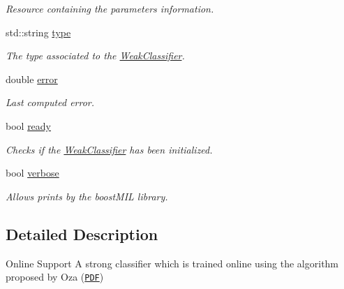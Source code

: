 \begin{DoxyCompactItemize}
\begin{DoxyCompactList}\small\item\em Resource containing the parameters information. \end{DoxyCompactList}\item 
std\+::string \hyperlink{classiCub_1_1boostMIL_1_1WeakClassifier_a6e08c26ea2e12086317d6cdd0f65bbd9}{type}\label{classiCub_1_1boostMIL_1_1WeakClassifier_a6e08c26ea2e12086317d6cdd0f65bbd9}

\begin{DoxyCompactList}\small\item\em The type associated to the \hyperlink{classiCub_1_1boostMIL_1_1WeakClassifier}{Weak\+Classifier}. \end{DoxyCompactList}\item 
double \hyperlink{classiCub_1_1boostMIL_1_1WeakClassifier_afa9e7bb9b9a92d349b40a4f127386a59}{error}\label{classiCub_1_1boostMIL_1_1WeakClassifier_afa9e7bb9b9a92d349b40a4f127386a59}

\begin{DoxyCompactList}\small\item\em Last computed error. \end{DoxyCompactList}\item 
bool \hyperlink{classiCub_1_1boostMIL_1_1WeakClassifier_a7fe5fe3366a82def4031c16a9a278350}{ready}\label{classiCub_1_1boostMIL_1_1WeakClassifier_a7fe5fe3366a82def4031c16a9a278350}

\begin{DoxyCompactList}\small\item\em Checks if the \hyperlink{classiCub_1_1boostMIL_1_1WeakClassifier}{Weak\+Classifier} has been initialized. \end{DoxyCompactList}\item 
bool \hyperlink{classiCub_1_1boostMIL_1_1WeakClassifier_a63a5602437f6936da17e33ca4d89976a}{verbose}\label{classiCub_1_1boostMIL_1_1WeakClassifier_a63a5602437f6936da17e33ca4d89976a}

\begin{DoxyCompactList}\small\item\em Allows prints by the boost\+M\+I\+L library. \end{DoxyCompactList}\end{DoxyCompactItemize}


\subsection{Detailed Description}
Online Support A strong classifier which is trained online using the algorithm proposed by Oza (\href{http://ti.arc.nasa.gov/m/profile/oza/b2hd-oza05.html}{\tt P\+D\+F}) 

